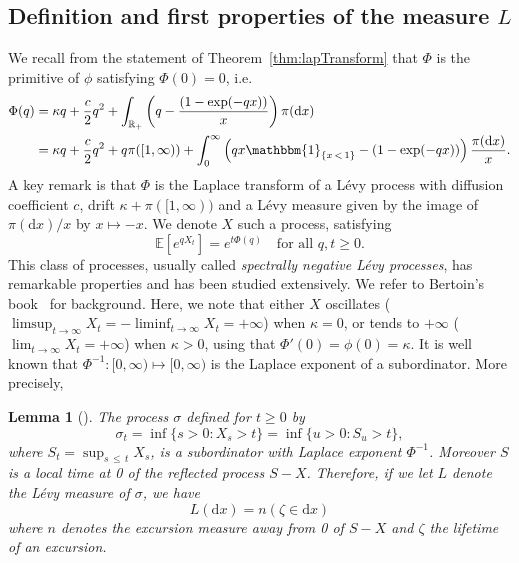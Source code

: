 \documentclass[10pt]{amsart}
\newtheorem{lemm}[theo]{Lemma}
\theoremstyle{definition}
\numberwithin{equation}{section}
\newcommand{\R}{\mathbb{R}}
\newcommand{\bbE}{\mathbb{E}}
\newcommand{\dd}{\mathrm{d}}
\newcommand{\ind}[1]{\mathbbm{1}_{\left\{#1\right\}}}
\begin{document}
\subsection{Definition and first properties of the measure \texorpdfstring{$L$}{L}}\label{sec:L}

We recall from the statement of Theorem~\ref{thm:lapTransform} that $\Phi$ is the primitive of $\phi$ satisfying $\Phi(0) = 0$, i.e.
\begin{align}\label{LK_Phi}
\Phi(q)&=\kappa q+\frac{c}{2}q^2+\int_{\R _+} \left(q-\frac{\left(1-\exp(-qx)\right)}{x}\right)\pi(\dd x) \\
\nonumber &= \kappa q+\frac{c}{2}q^2+ q \pi([1,\infty))+\int_0^{\infty} \left(qx \ind{x\,<\,1} -\left(1-\exp(-qx)\right)\right) \frac{\pi(\dd x)}{x}.
\end{align}
A key remark is that $\Phi$ is the Laplace transform of a Lévy process with diffusion coefficient $c$, drift $\kappa + \pi([1,\infty))$ and a Lévy measure given by the image of $\pi(\dd x)/x$ by $x \mapsto -x$. We denote $X$ such a process, satisfying
\begin{equation*}\label{def_X}
\bbE\left[e^{qX_t}\right]=e^{t \Phi(q)} \quad \text{for all } q,t \geq 0.
\end{equation*}
This class of processes, usually called \emph{spectrally negative Lévy processes}, has remarkable properties and has been studied extensively. We refer to Bertoin's book~\cite[Chapter~VII]{BLevy} for background. Here, we note that either $X$ oscillates ($\limsup_{t\rightarrow \infty} X_t=-\liminf_{t\rightarrow \infty} X_t=+\infty$) when $\kappa=0$, or tends to $+\infty$ ($\lim_{t\rightarrow \infty} X_t=+\infty$) when $\kappa>0$, using that $\Phi'(0)=\phi(0)=\kappa$. It is well known that $\Phi^{-1}:[0,\infty)\mapsto [0,\infty)$ is the Laplace exponent of a subordinator. More precisely,

\begin{lemm}[{\cite[Theorem~1, Chapter~VII]{BLevy}}]
The process $\sigma$ defined for $t \geq 0$ by
\[
\sigma_t = \inf\{ s > 0 : X_s > t\}=\inf\{ u >0:S_u>t\},
\]
where $S_t = \sup_{s\,\leq\,t} X_s$, is a subordinator with Laplace exponent $\Phi^{-1}$. Moreover $S$ is a local time at 0 of the reflected process $S-X$. Therefore, if we let $L$ denote the Lévy measure of $\sigma$, we have
\[
L(\dd x)=n(\zeta \in \dd x)
\]
where $n$ denotes the excursion measure away from 0 of $S-X$ and $\zeta$ the lifetime of an excursion.
\end{lemm}
\end{document}
